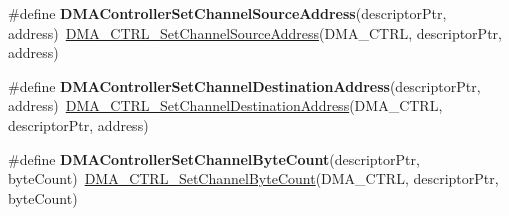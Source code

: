 \begin{DoxyCompactItemize}
\item 
\hypertarget{group___func_ala_ga2746212e7c113bb2fbb12076cb375924}{\#define {\bfseries D\-M\-A\-Controller\-Set\-Channel\-Source\-Address}(descriptor\-Ptr, address)~\hyperlink{group___d_m_a___c_t_r_l__module_gad8a42d75e916ffb25a8e4dc019e41c70}{D\-M\-A\-\_\-\-C\-T\-R\-L\-\_\-\-Set\-Channel\-Source\-Address}(D\-M\-A\-\_\-\-C\-T\-R\-L, descriptor\-Ptr, address)}\label{group___func_ala_ga2746212e7c113bb2fbb12076cb375924}

\item 
\hypertarget{group___func_ala_ga6a8c2efb178d9ec28d24b8caeeabbcc7}{\#define {\bfseries D\-M\-A\-Controller\-Set\-Channel\-Destination\-Address}(descriptor\-Ptr, address)~\hyperlink{group___d_m_a___c_t_r_l__module_ga6eda6f1b27d9f04235bd0304fad7db0e}{D\-M\-A\-\_\-\-C\-T\-R\-L\-\_\-\-Set\-Channel\-Destination\-Address}(D\-M\-A\-\_\-\-C\-T\-R\-L, descriptor\-Ptr, address)}\label{group___func_ala_ga6a8c2efb178d9ec28d24b8caeeabbcc7}

\item 
\hypertarget{group___func_ala_ga16353dc98e3122ef3f06358b7401f886}{\#define {\bfseries D\-M\-A\-Controller\-Set\-Channel\-Byte\-Count}(descriptor\-Ptr, byte\-Count)~\hyperlink{group___d_m_a___c_t_r_l__module_ga04ea535c86b9e0054c137c2aa38668cc}{D\-M\-A\-\_\-\-C\-T\-R\-L\-\_\-\-Set\-Channel\-Byte\-Count}(D\-M\-A\-\_\-\-C\-T\-R\-L, descriptor\-Ptr, byte\-Count)}\label{group___func_ala_ga16353dc98e3122ef3f06358b7401f886}

\end{DoxyCompactItemize}

